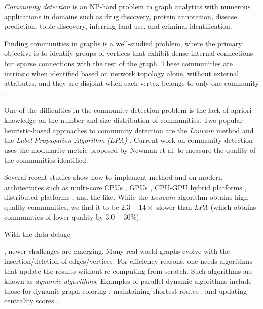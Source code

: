 \textit{Community detection} is an NP-hard problem in graph analytics with numerous applications in domains such as drug discovery, protein annotation, disease prediction, topic discovery, inferring land use, and criminal identification. Finding communities in graphs is a well-studied problem, where the primary objective is to identify groups of vertices that exhibit dense internal connections but sparse connections with the rest of the graph. These communities are intrinsic when identified based on network topology alone, without external attributes, and they are disjoint when each vertex belongs to only one community \cite{com-gregory10}.

One of the difficulties in the community detection problem is the lack of apriori knowledge on the number and size distribution of communities. Two popular heuristic-based approaches to community detection are the \textit{Louvain} method \cite{com-blondel08} and the \textit{Label Propagation Algorithm (LPA)} \cite{com-raghavan07}. Current work on community detection uses the modularity metric proposed by Newman et al. \cite{com-newman06} to measure the quality of the communities identified. Several recent studies show how to implement \Lou{} method and \LPA{} on modern architectures such as multi-core CPUs \cite{com-fazlali17}, GPUs \cite{com-cheong13}, CPU-GPU hybrid platforms \cite{com-bhowmick22}, distributed platforms \cite{com-ghosh18}, and the like. While the \textit{Louvain} algorithm obtains high-quality communities, we find it to be $2.3 - 14\times$ slower than \textit{LPA} (which obtains communities of lower quality by $3.0 - 30\%$).

 With the data deluge, newer challenges are emerging. Many real-world graphs evolve with the insertion/deletion of edges/vertices. For efficiency reasons, one needs algorithms that update the results without re-computing from scratch. Such algorithms are known as \textit{dynamic algorithms}. Examples of parallel dynamic algorithms include those for dynamic graph coloring \cite{color-yuan17, color-bhattacharya18}, maintaining shortest routes \cite{path-zhang17, path-khanda21}, and updating centrality scores \cite{cent-shao20, cent-regunta21}.


